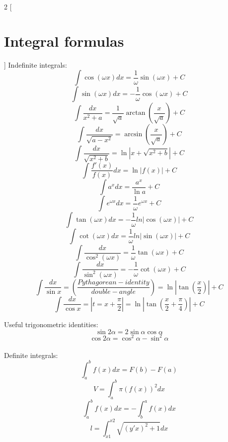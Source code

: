 \documentclass{article}
\begin{document}
\newcommand\efrac[2]{\genfrac{}{}{0pt}{}{#1}{#2}}

\begin{multicols}{2}
[
\section{Integral formulas}
]
Indefinite integrals:
\[\int \cos(\omega x)dx = \frac{1}{\omega} \sin(\omega x) + C\]
\[\int \sin(\omega x)dx = - \frac{1}{\omega} \cos(\omega x) + C\]
\[\int \frac{dx}{x^2 + a} = \frac{1}{\sqrt{a}} \arctan(\frac{x}{\sqrt{a}}) + C\]
\[\int \frac{dx}{\sqrt{a - x^2}} =  \arcsin(\frac{x}{\sqrt{a}}) + C\]
\[\int \frac{dx}{\sqrt{x^2 + b}} = \ln|x + \sqrt{x^2 + b} |+ C\]
\[\int \frac{f'(x)}{f(x)}dx = \ln|f(x)| + C\]
\[\int a^x dx = \frac{a^x}{\ln a} + C\]
\[\int e^{\omega x} dx = \frac{1}{\omega} e^{\omega x} + C\]
\[\int \tan(\omega x) dx = - \frac{1}{\omega} ln|\cos(\omega x)| + C\]
\[\int \cot(\omega x) dx = \frac{1}{\omega} ln|\sin(\omega x)| + C\]
\[\int \frac{dx}{\cos^2(\omega x)} = \frac{1}{\omega}  \tan(\omega x) + C\]
\[\int \frac{dx}{\sin^2(\omega x)} = - \frac{1}{\omega}  \cot(\omega x) + C\]
\[\int \frac{dx}{\sin x} = (\frac{Pythagorean-identity}{double-angle}) = \ln|\tan(\frac{x}{2})| + C \]
\[\int \frac{dx}{\cos x} = |t = x + \frac{\pi}{2}| = \ln |\tan(\frac{x}{2} + \frac{\pi}{4}) | + C \]

Useful trigonometric identities:
\[\sin2 \alpha = 2\sin\alpha\cos\alpha \]
\[ \cos2\alpha = \cos^2 \alpha - \sin^2 \alpha \]
\\
Definite integrals:
\[\int_{a}^{b} f(x) dx = F(b) - F(a)\]
\[ V = \int_{a}^{b} \pi (f(x))^2 dx\]
\[ \int_{a}^{b} f(x) dx = - \int_{b}^{a} f(x) dx\]
\[ l = \int_{x1}^{x2} \sqrt{(y'x)^2 + 1} dx  \]


\end{multicols}
\end{document}
